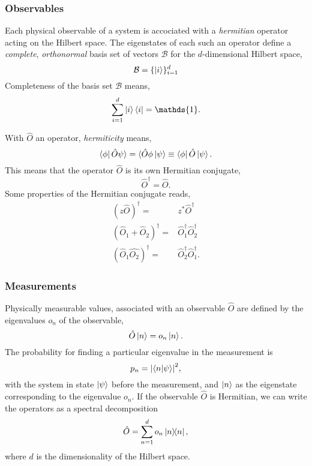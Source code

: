     \subsubsection{Observables}
    Each physical observable of a system is accociated with a \emph{hermitian}
    operator acting on the Hilbert space. The eigenstates of each such
    an operator define a \emph{complete}, \emph{orthonormal} basis set of vectors
    $\mathcal{B}$ for the $d$-dimensional Hilbert space,
    \begin{equation}
        \mathcal{B} = \{\ket{i}\}_{i=1}^d
    \end{equation}
    Completeness of the basis set $\mathcal{B}$ means,
    \begin{equation}
        \sum_{i=1}^d \ket{i}\bra{i} = \mathds{1}.
    \end{equation}

    With $\hat{O}$ an operator, \emph{hermiticity} means,
    \begin{equation}
        \bra{\phi}\hat{O}\psi\rangle = \langle\hat{O}\phi\ket{\psi} \equiv \bra{\phi} \hat{O} \ket{\psi}.
    \end{equation}
    This means that the operator $\hat{O}$ is its own Hermitian conjugate,
    \begin{equation}
        \hat{O}^\dagger = \hat{O}.
    \end{equation}
    Some properties of the Hermitian conjugate reads,
    \begin{align}
       (z\hat{O})^\dagger =& z^*\hat{O}^\dagger \\
       (\hat{O}_1 + \hat{O}_2)^\dagger =& \hat{O}_1^\dagger \hat{O}_2^\dagger \\
       (\hat{O}_1\hat{O_2})^\dagger =& \hat{O}_2^\dagger \hat{O}_1^\dagger.
    \end{align}

    \subsubsection{Measurements}
    Physically measurable values, associated with an observable $\hat{O}$ are defined by the 
    eigenvalues $o_n$ of the observable,
    \begin{equation}
        \hat{O}\ket{n} = o_n\ket{n}.
    \end{equation}
    The probability for finding a particular eigenvalue in the measurement is
    \begin{equation}
        p_n = \abs{\braket{n}{\psi}}^2,
    \end{equation}
    with the system in state $\ket{\psi}$ before the measurement, and $\ket{n}$ as the 
    eigenstate corresponding to the eigenvalue $o_n$.
    If the observable $\hat{O}$ is Hermitian, we can write the operators as a spectral 
    decomposition 
    \begin{equation}
        \hat{O} = \sum_{n=1}^d o_n \dyad{n},
    \end{equation}
    where $d$ is the dimensionality of the Hilbert space.

